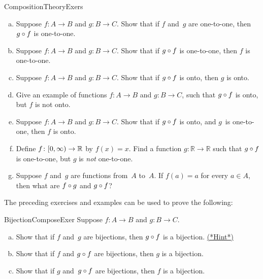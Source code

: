 \begin{exercise}{CompositionTheoryExers} \ 
\begin{enumerate}[(a)]
 \item \label{CompositionTheoryExers-gof11} 
 Suppose $f \colon A \to B$ and $g \colon B \to C$. Show that if $f$ and~$g$ are one-to-one, then $g \circ f$ is one-to-one. 
  \item \label{CompositionTheoryExers-f11} 
Suppose $f \colon A \to B$ and $g \colon B \to C$. Show that if $g \circ f$ is one-to-one, then $f$ is one-to-one.
 \item \label{CompositionTheoryExers-gonto} 
Suppose $f \colon A \to B$ and $g \colon B \to C$. Show that if $g \circ f$ is onto, then $g$ is onto.
 \item \label{CompositionTheoryExers-egNotOnto} 
Give an example of functions $f \colon A \to B$ and $g \colon B \to C$, such that $g \circ f$ is onto, but $f$ is not onto. 
 \item \label{CompositionTheoryExers-fonto} 
Suppose $f \colon A \to B$ and $g \colon B \to C$. Show that if $g \circ f$ is onto, 
 and $g$~is one-to-one, then $f$ is onto.
 \item  \label{CompositionTheoryExers-gNot11} 
Define $f \colon [0,\infty) \to \mathbb{R}$ by $f(x) = x$. Find a function $g \colon \mathbb{R} \to \mathbb{R}$ such that 
$g \circ f$ is one-to-one, but $g$ is \emph{not} one-to-one.
 \item  \label{CompositionTheoryExers-what} 
Suppose $f$ and~$g$ are functions from~$A$ to~$A$. If $f(a) = a$ for every $a \in A$, then what are $f \circ g$ and $g \circ f$?
\end{enumerate}
\end{exercise}
 
The preceding exercises and examples can be used to prove the following:

 \begin{exercise}{BijectionComposeExer}
 Suppose $f \colon A \to B$ and $g \colon B \to C$.
 \begin{enumerate}[(a)]
 \item \label{BijectionComposeExer-gf}
 Show that if $f$ and~$g$ are bijections, then $g \circ f$ is a bijection.
 \hyperref[sec:functions:hints]{(*Hint*)}
 \item  \label{BijectionComposeExer-g}
Show that if $f$ and $g\circ f$ are bijections, then $g$ is a bijection.
 \item \label{BijectionComposeExer-f}
Show that if $g$ and~$g \circ f$ are bijections, then $f$ is a bijection.
 \end{enumerate}
 \end{exercise}
  
